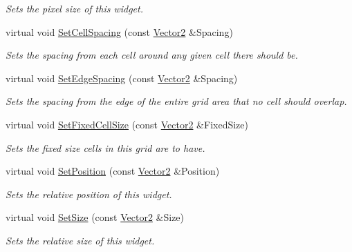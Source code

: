 \begin{DoxyCompactItemize}
\begin{DoxyCompactList}\small\item\em Sets the pixel size of this widget. \item\end{DoxyCompactList}\item 
virtual void \hyperlink{classphys_1_1UI_1_1CellGrid_ac62bf02320f381012d22941d07ae62a2}{SetCellSpacing} (const \hyperlink{classphys_1_1Vector2}{Vector2} \&Spacing)
\begin{DoxyCompactList}\small\item\em Sets the spacing from each cell around any given cell there should be. \item\end{DoxyCompactList}\item 
virtual void \hyperlink{classphys_1_1UI_1_1CellGrid_aa55c328e2d222570d5c72bb50a48f8a5}{SetEdgeSpacing} (const \hyperlink{classphys_1_1Vector2}{Vector2} \&Spacing)
\begin{DoxyCompactList}\small\item\em Sets the spacing from the edge of the entire grid area that no cell should overlap. \item\end{DoxyCompactList}\item 
virtual void \hyperlink{classphys_1_1UI_1_1CellGrid_ad8a6d111b1906b0eb165fcedc0917452}{SetFixedCellSize} (const \hyperlink{classphys_1_1Vector2}{Vector2} \&FixedSize)
\begin{DoxyCompactList}\small\item\em Sets the fixed size cells in this grid are to have. \item\end{DoxyCompactList}\item 
virtual void \hyperlink{classphys_1_1UI_1_1CellGrid_abf0552ebbe369f6b695f91fdaa220c20}{SetPosition} (const \hyperlink{classphys_1_1Vector2}{Vector2} \&Position)
\begin{DoxyCompactList}\small\item\em Sets the relative position of this widget. \item\end{DoxyCompactList}\item 
virtual void \hyperlink{classphys_1_1UI_1_1CellGrid_a83de47589cb02ce49882f795e9281f57}{SetSize} (const \hyperlink{classphys_1_1Vector2}{Vector2} \&Size)
\begin{DoxyCompactList}\small\item\em Sets the relative size of this widget. \item\end{DoxyCompactList}\item 

\end{DoxyCompactItemize}
